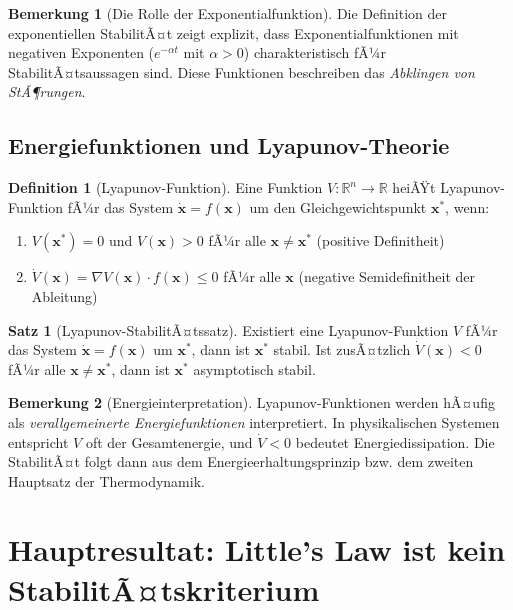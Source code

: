 ﻿\documentclass[a4paper,12pt]{report}
\theoremstyle{definition}
\newtheorem{definition}{Definition}[section]
\newtheorem{bemerkung}{Bemerkung}[section]
\newtheorem{satz}{Satz}[section]
\begin{document}
\begin{bemerkung}[Die Rolle der Exponentialfunktion]
	Die Definition der exponentiellen StabilitÃ¤t zeigt explizit, dass Exponentialfunktionen mit negativen Exponenten ($e^{-\alpha t}$ mit $\alpha > 0$) charakteristisch fÃ¼r StabilitÃ¤tsaussagen sind. Diese Funktionen beschreiben das \textit{Abklingen von StÃ¶rungen}.
\end{bemerkung}

\subsection{Energiefunktionen und Lyapunov-Theorie}

\begin{definition}[Lyapunov-Funktion]
	Eine Funktion $V: \mathbb{R}^n \to \mathbb{R}$ heiÃŸt Lyapunov-Funktion fÃ¼r das System $\dot{\mathbf{x}} = f(\mathbf{x})$ um den Gleichgewichtspunkt $\mathbf{x}^*$, wenn:
	\begin{enumerate}
		\item[-] $V(\mathbf{x}^*) = 0$ und $V(\mathbf{x}) > 0$ fÃ¼r alle $\mathbf{x} \neq \mathbf{x}^*$ (positive Definitheit)
		\item[-] $\dot{V}(\mathbf{x}) = \nabla V(\mathbf{x}) \cdot f(\mathbf{x}) \leq 0$ fÃ¼r alle $\mathbf{x}$ (negative Semidefinitheit der Ableitung)
	\end{enumerate}
\end{definition}

\begin{satz}[Lyapunov-StabilitÃ¤tssatz]
	Existiert eine Lyapunov-Funktion $V$ fÃ¼r das System $\dot{\mathbf{x}} = f(\mathbf{x})$ um $\mathbf{x}^*$, dann ist $\mathbf{x}^*$ stabil. Ist zusÃ¤tzlich $\dot{V}(\mathbf{x}) < 0$ fÃ¼r alle $\mathbf{x} \neq \mathbf{x}^*$, dann ist $\mathbf{x}^*$ asymptotisch stabil.
\end{satz}

\begin{bemerkung}[Energieinterpretation]
	Lyapunov-Funktionen werden hÃ¤ufig als \textit{verallgemeinerte Energiefunktionen} interpretiert. In physikalischen Systemen entspricht $V$ oft der Gesamtenergie, und $\dot{V} < 0$ bedeutet Energiedissipation. Die StabilitÃ¤t folgt dann aus dem Energieerhaltungsprinzip bzw. dem zweiten Hauptsatz der Thermodynamik.
\end{bemerkung}

\section{Hauptresultat: Little's Law ist kein StabilitÃ¤tskriterium}
\end{document}
